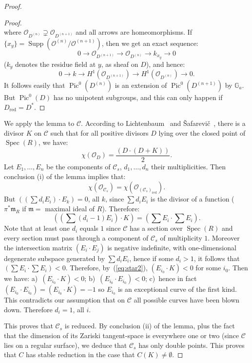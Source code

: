 \documentclass[10pt]{amsart}
\theoremstyle{plain}
\theoremstyle{definition}
\DeclareMathOperator{\Pic}{Pic}
\DeclareMathOperator{\Spec}{Spec}
\DeclareMathOperator{\red}{red}
\DeclareMathOperator{\Supp}{Supp}
\newcommand{\cO}{\mathcal{O}}
\newcommand{\m}{\mathfrak{m}}
\begin{document}
\begin{proof}
\begin{proof}
\[\]
where $\cO_{D^{(n)}} \supsetneq \cO_{D^{(n+1)}}$ and all arrows are homeomorphisms. If $\{x_y\} = \Supp(\cO^{(n)}/\cO^{(n+1)})$, then we get an exact sequence:
\[
0 \longrightarrow \cO_{D^{(n+1)}} \longrightarrow \cO_{D^{(n)}} \longrightarrow k_{x_y} \longrightarrow 0
\]
($k_y$ denotes the residue field at $y$, as sheaf on $D$), and hence:
\[
0 \longrightarrow k \longrightarrow H^1(\cO_{D^{(n+1)}}) \longrightarrow H^1(\cO_{D^{(n)}}) \longrightarrow 0.
\]
It follows easily that $\Pic^0(D^{(n)})$ is an extension of $\Pic^0(D^{(n+1)})$ by $\mathbb{G}_a$. But $\Pic^0(D)$ has no unipotent subgroups, and this can only happen if $D_{\red} = D^*$.
\end{proof}

We apply the lemma to $\mathscr{C}$. According to Lichtenbaum~\cite{L} and \v{S}afarevi\v{c}~\cite{Saf}, there is a divisor $K$ on $\mathscr{C}$ such that for all positive divisors $D$ lying over the closed point of $\Spec(R)$, we have:
\[
\chi(\cO_D) = \frac{(D \cdot (D + K))}{2}.
\]
Let $E_1, \ldots, E_n$ be the components of $\mathscr{C}_s$, $d_1, \ldots, d_n$ their multiplicities. Then conclusion (i) of the lemma implies that:
\[
\chi(\cO_{\mathscr{C}_s}) = \chi(\cO_{(\mathscr{C}_s)_{\red}}).
\]
But $((\sum d_i E_i) \cdot E_k) = 0$, all $k$, since $\sum d_i E_i$ is the divisor of a function ($\pi^* \m_R$ if $\m = $ maximal ideal of $R$). Therefore:
\begin{equation}\tag{$*$}\label{eq:star2}
((\sum (d_i - 1) E_i) \cdot K) = (\sum E_i \cdot \sum E_i).
\end{equation}
Note that at least one $d_i$ equals $1$ since $\mathscr{C}$ has a section over $\Spec(R)$ and every section must pass through a component of $\mathscr{C}_s$ of multiplicity $1$. Moreover the intersection matrix $(E_i \cdot E_j)$ is negative indefinite, with one-dimensional degenerate subspace generated by $\sum d_i E_i$, hence if some $d_i > 1$, it follows that $(\sum E_i \cdot \sum E_i) < 0$. Therefore, by~(\ref{eq:star2}), $(E_{i_0} \cdot K) < 0$ for some $i_0$. Then we have: a)~$(E_{i_0} \cdot K) < 0$; b)~$(E_{i_0} \cdot E_{i_0}) < 0$; c)~hence in fact $(E_{i_0} \cdot E_{i_0}) = (E_{i_0} \cdot K) = -1$ so $E_{i_0}$ is an exceptional curve of the first kind. This contradicts our assumption that on $\mathscr{C}$ all possible curves have been blown down. Therefore $d_i = 1$, all $i$.

This proves that $\mathscr{C}_s$ is reduced. By conclusion (ii) of the lemma, plus the fact that the dimension of its Zariski tangent-space is everywhere one or two (since $\mathscr{C}$ lies on a regular surface), we deduce that $\mathscr{C}_s$ has only double points. This proves that $C$ has stable reduction in the case that $C(K) \neq \emptyset$.


\end{proof}
\end{document}
